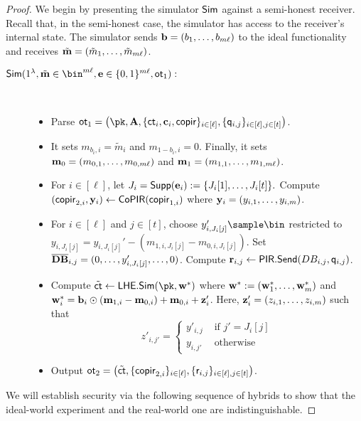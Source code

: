 \begin{proof}
We begin by presenting the simulator $\mathsf{Sim}$ against a semi-honest receiver. Recall that, in the semi-honest case, the simulator has access to the receiver's internal state. The simulator sends $\mathbf{b}=(b_1,\dots, b_{m\ell})$ to the ideal functionality and receives $\tilde{\mathbf{m}}=(\tilde m_1,\dots,\tilde m_{m\ell})$. 

\begin{description}
\item[$\Sim(1^\lambda,\tilde \mn\in\bin^{m\ell},\vc{e}\in\bits^{m\ell}, \ot_1):$]~
\begin{itemize}
  \item Parse $\ot_1=\left(\pk,\vc{A},\{\ct_i,\vc{c}_i,\copir\}_{i\in [\ell]},\{\quer_{i,j}\}_{i \in [\ell], j \in [t]}\right)$.
  \item It sets $m_{b_i,i}=\tilde m_i$ and $m_{1-b_i,i}=0$. Finally, it sets $\mathbf{m}_0=(m_{0,1},\dots, m_{0,m\ell})$ and $\mathbf{m}_1=(m_{1,1},\dots, m_{1,m\ell})$.
  \item For $i\in[\ell]$, let $J_i=\mathsf{Supp}(\mathbf{e}_i):=\{J_i[1],\dots,J_i[t]\}.$ Compute $(\mathsf{copir}_{2,i},\mathbf{y}_i)\leftarrow\mathsf{CoPIR}(\mathsf{copir}_{1,i})$ where $\mathbf{y}_i=(y_{i,1},\dots, y_{i,m})$.
  \item For $i\in[\ell]$ and $j\in[t]$, choose $y'_{i,J_i[j]}\sample \bin$ restricted to $y_{i,J_i[j]}=y_{i,J_i[j]}'-(m_{1,i,J_i[j]}-m_{0,i,J_i[j]})$. Set $\overline{\mathbf{DB}}_{i,j}=(0,\dots,y_{i,J_i[j]}',\dots, 0)$. Compute $\mathbf{r}_{i,j}\gets\mathsf{PIR}.\mathsf{Send}(DB_{i,j},\mathsf{q}_{i,j})$.
 \item Compute $\tilde{\ct}\gets\LHE.\Sim(\pk,\wn^\ast)$ where $\mathbf{w}^\ast:=(\mathbf{w}_1^\ast,\dots,\mathbf{w}_m^\ast)$ and $\mathbf{w}^\ast_i=\mathbf{b}_i\odot (\mathbf{m}_{1,i}-\mathbf{m}_{0,i})+\mathbf{m}_{0,i}+\mathbf{z}_i'$. Here, $\mathbf{z}_i'=(z_{i,1},\dots,z_{i,m})$ such that \[
 z'_{i,j'} = \begin{cases} y'_{i,j} & \text{ if } j' = J_i[j]\\ y_{i,j'} & \text{ otherwise}\end{cases}
 \] 
  \item Output $\mathsf{ot}_2=\left(\tilde{\mathsf{ct}},\{\mathsf{copir}_{2,i}\}_{i\in[\ell]}, \{\mathsf{r}_{i,j}\}_{i \in [\ell], j \in [t]} \right)$.
\end{itemize}
\end{description}


We will establish security via the following sequence of hybrids to show that the ideal-world experiment and the real-world one are indistinguishable. 






\end{proof}
